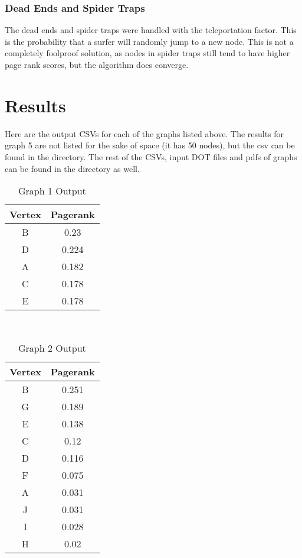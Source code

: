 \documentclass{article}
\begin{document}
\subsubsection{Dead Ends and Spider Traps}
The dead ends and spider traps were handled with the teleportation factor. This is the probability that a surfer will randomly jump to a new node. This is not a completely foolproof solution, as nodes in spider traps still tend to have higher page rank scores, but the algorithm does converge. 

\section{Results}
Here are the output CSVs for each of the graphs listed above. The results for graph 5 are not listed for the sake of space (it has 50 nodes), but the csv can be found in the directory.  The rest of the CSVs, input DOT files and pdfs of graphs can be found in the directory as well.
\begin{table}[ht!]
    \centering
        \begin{tabular}{| c | c |}
        \hline
        Vertex & Pagerank \\
        \hline
        B & 0.23 \\ 
        \hline
        D & 0.224 \\ 
        \hline
        A & 0.182 \\
        \hline
        C & 0.178 \\
        \hline
        E & 0.178 \\
        \hline
        \end{tabular} \\
        \caption{Graph 1 Output}
\end{table}
\begin{table}[ht!]
    \centering
        \begin{tabular}{| c | c |}
        \hline
        Vertex & Pagerank \\
        \hline
        B & 0.251 \\ 
        \hline
        G & 0.189 \\ 
        \hline
        E & 0.138 \\
        \hline
        C & 0.12 \\
        \hline
        D & 0.116 \\
        \hline
        F & 0.075 \\ 
        \hline
        A & 0.031 \\ 
        \hline
        J & 0.031 \\
        \hline
        I & 0.028 \\
        \hline
        H & 0.02 \\
        \hline
        \end{tabular} \\
        \caption{Graph 2 Output}
\end{table}
\end{document}
